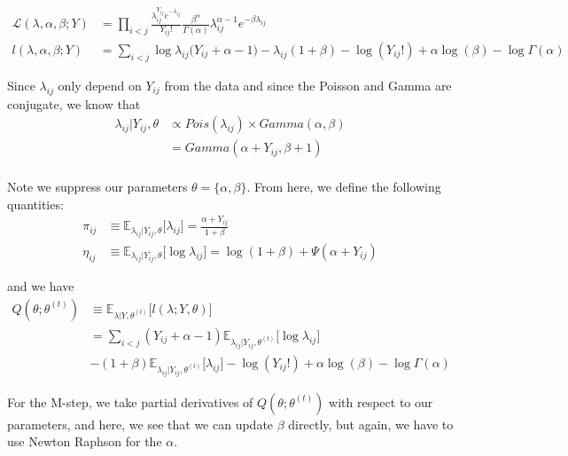 \documentclass{article}
\begin{document}
\begin{align*}
\mathcal{L}(\lambda, \alpha, \beta; Y) &= \prod_{i<j}\frac{\lambda_{ij}^{Y_{ij}}e^{-\lambda_{ij}}}{Y_{ij}!} \frac{\beta^{\alpha}}{\Gamma(\alpha)}\lambda_{ij}^{\alpha - 1}e^{-\beta \lambda_{ij}} \\
l(\lambda, \alpha, \beta ; Y) &= \sum_{i<j} \log \lambda_{ij}\big(Y_{ij} + \alpha - 1) - \lambda_{ij}(1+ \beta) -\log(Y_{ij}!) + \alpha \log(\beta) - \log \Gamma(\alpha)
\end{align*}

Since $\lambda_{ij}$ only depend on $Y_{ij}$ from the data and since the Poisson and Gamma are conjugate, we know that 
\begin{align*}
\lambda_{ij}|Y_{ij}, \theta &\propto Pois(\lambda_{ij}) \times Gamma(\alpha, \beta ) \\
	&= Gamma(\alpha + Y_{ij}, \beta + 1) \\
\end{align*}

Note we suppress our parameters $\theta = \{\alpha, \beta\}$. From here, we define the following quantities:
\begin{align*}
\pi_{ij} &\equiv \mathbb{E}_{\lambda_{ij}|Y_{ij}, \theta}\big[\lambda_{ij} \big] = \frac{\alpha + Y_{ij}}{1+ \beta} \\
\eta_{ij} &\equiv \mathbb{E}_{\lambda_{ij}|Y_{ij}, \theta}\big[\log \lambda_{ij} \big] = \log(1 + \beta) + \Psi (\alpha + Y_{ij})
\end{align*}

and we have
\begin{align*}
Q(\theta; \theta^{(t)}) &\equiv \mathbb{E}_{\lambda|Y, \theta^{(t)}}\big[l (\lambda; Y, \theta) \big] \\
	&= \sum_{i<j} (Y_{ij}+ \alpha - 1)\mathbb{E}_{\lambda_{ij}|Y_{ij}, \theta^{(t)}} \big[\log \lambda_{ij}\big] \\
	&- (1+ \beta)\mathbb{E}_{\lambda_{ij}|Y_{ij}, \theta^{(t)}}\big[\lambda_{ij}\big] -\log(Y_{ij}!) + \alpha \log(\beta) - \log \Gamma(\alpha)
\end{align*}

For the M-step, we take partial derivatives of $Q(\theta; \theta^{(t)})$ with respect to our parameters, and here, we see that we can update $\beta$ directly, but again, we have to use Newton Raphson for the $\alpha$. 
\end{document}
